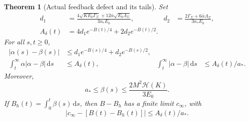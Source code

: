 \documentclass[11pt]{article}
\numberwithin{equation}{section}
\newtheorem{theorem}{Theorem}[section]
\newcommand{\dd}{\,\mathrm d}
\begin{document}
\begin{theorem}[Actual feedback defect and its tails]\label{r13:defect}
Set
\begin{align}
 d_1&=\frac{4\sqrt{KE_0\Gamma_\Sigma}
                  +12\bar\alpha\sqrt{E_0\Lambda_\Sigma}}{3n_*E_0},
 &d_2&=\frac{2\Gamma_\Sigma+6\bar\alpha\Lambda_\Sigma}{3n_*E_0},
 \label{r13:defectconstants}\\
 A_\delta(t)&=4d_1e^{-B(t)/4}+2d_2e^{-B(t)/2}.
 &&\label{r13:defecttailconstant}
\end{align}
For all $s,t\ge0$,
\begin{align}
 |\alpha(s)-\beta(s)|
   &\le d_1e^{-B(s)/4}+d_2e^{-B(s)/2},
 \label{r13:defectbound}\\
 \int_t^\infty\alpha|\alpha-\beta|\dd s
   &\le A_\delta(t),&
 \int_t^\infty|\alpha-\beta|\dd s
   &\le A_\delta(t)/a_*.
 \label{r13:defecttails}
\end{align}
Moreover,
\begin{equation}\label{r13:betabounds}
 a_*\le\beta(s)\le\frac{2M^2\mathcal H(K)}{3E_0}.
\end{equation}
If $B_h(t)=\int_0^t\beta(s)\dd s$, then $B-B_h$ has a finite limit
$c_\infty$, with
\begin{equation}\label{r13:compressionoffset}
 |c_\infty-[B(t)-B_h(t)]|\le A_\delta(t)/a_*.
\end{equation}
\end{theorem}
\end{document}
